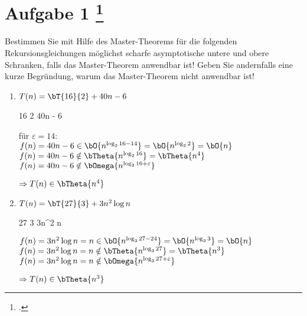 \documentclass{bschlangaul-aufgabe}
\begin{document}
\let\O=\bO
\let\o=\bOmega
\let\T=\bT
\let\t=\bTheta

\section{Aufgabe 1
\footcite{examen:66115:2011:03}}

Bestimmen Sie mit Hilfe des Master-Theorems für die folgenden
Rekursionsgleichungen möglichst scharfe asymptotische untere und obere
Schranken, falls das Master-Theorem anwendbar ist! Geben Sie andernfalls
eine kurze Begründung, warum das Master-Theorem nicht anwendbar ist!

\bMasterExkurs

\begin{enumerate}

\item $T(n) = \T{16}{2} + 40n - 6$

\begin{liAntwort}
\bMasterVariablenDeklaration
{16} %
{2} %
{40n - 6} %

\bMasterFallRechnung
{für $\varepsilon = 14$: \\
$f(n) = 40n - 6 \in \O{n^{\log_2 {16 - 14}}} = \O{n^{\log_2 2}} = \O{n}$}
{$f(n) = 40n - 6 \notin \t{n^{\log_2 {16}}} = \t{n^4}$}
{$f(n) = 40n - 6 \notin \o{n^{\log_2 {16 + \varepsilon}}}$}

$\Rightarrow T(n) \in \t{n^4}$

\end{liAntwort}


\item $T(n) = \T{27}{3} + 3n^2 \log n$

\begin{liAntwort}
\bMasterVariablenDeklaration
{27} %
{3} %
{3n^2 \log n} %

\bMasterFallRechnung
{$f(n) = 3n^2 \log n = n \in \O{n^{\log_3 {27 - 24}}} = \O{n^{\log_3 3}} = \O{n}$}
{$f(n) = 3n^2 \log n = n \notin \t{n^{\log_3 {27}}} = \t{n^3}$}
{$f(n) = 3n^2 \log n = n \notin \o{n^{\log_3 {27 + \varepsilon}}}$}

$\Rightarrow T(n) \in \t{n^3}$

\end{liAntwort}


\end{enumerate}
\end{document}
